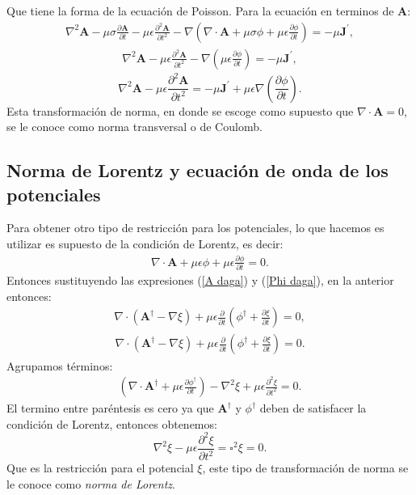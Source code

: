 \documentclass[11pt,fleqn]{book} %
\begin{document}
Que tiene la forma de la ecuaci\'on de Poisson. Para la ecuaci\'on en terminos de $\textbf{A}$:
\begin{eqnarray*}
\nabla^{2}\textbf{A}-\mu\sigma\frac{\partial \textbf{A}}{\partial t}-\mu\epsilon\frac{\partial^{2} \textbf{A}}{\partial t^{2}}-\nabla\left(\nabla\cdot\textbf{A}+\mu\sigma\phi+\mu\epsilon\frac{\partial \phi}{\partial t}\right)=-\mu\textbf{J}^{'},
\end{eqnarray*}
\begin{eqnarray*}
\nabla^{2}\textbf{A}-\mu\epsilon\frac{\partial^{2} \textbf{A}}{\partial t^{2}}-\nabla\left(\mu\epsilon\frac{\partial \phi}{\partial t}\right)=-\mu\textbf{J}^{'},
\end{eqnarray*}
\begin{equation}
\nabla^{2}\textbf{A}-\mu\epsilon\frac{\partial^{2} \textbf{A}}{\partial t^{2}}=-\mu\textbf{J}^{'}+\mu\epsilon\nabla\left(\frac{\partial \phi}{\partial t}\right).
\end{equation}
Esta transformaci\'on de norma, en donde se escoge como supuesto que $\nabla\cdot\textbf{A}=0$, se le conoce como norma transversal o de Coulomb.

\subsection{Norma de Lorentz y ecuaci\'on de onda de los potenciales}
Para obtener otro tipo de restricci\'on para los potenciales, lo que hacemos es utilizar es supuesto de la condici\'on de Lorentz, es decir:
\begin{eqnarray*}
\nabla\cdot\textbf{A}+\mu\epsilon\phi+\mu\epsilon\frac{\partial \phi}{\partial t}=0.
\end{eqnarray*}
Entonces sustituyendo las expresiones (\ref{A daga}) y (\ref{Phi daga}), en la anterior entonces:
\begin{eqnarray*}
\nabla\cdot \left( \textbf{A}^{\dagger}-\nabla\xi \right)+\mu\epsilon\frac{\partial }{\partial t}\left(\phi^{\dagger}+\frac{\partial \xi}{\partial t}\right)=0,
\end{eqnarray*}
\begin{eqnarray*}
\nabla\cdot \left( \textbf{A}^{\dagger}-\nabla\xi \right)+\mu\epsilon\frac{\partial }{\partial t}\left(\phi^{\dagger}+\frac{\partial \xi}{\partial t}\right)=0.
\end{eqnarray*}
Agrupamos t\'erminos:
\begin{eqnarray*}
\left(\nabla\cdot\textbf{A}^{\dagger}+\mu\epsilon\frac{\partial \phi^{\dagger}}{\partial t}\right)-\nabla^{2}\xi+\mu\epsilon\frac{\partial^{2} \xi}{\partial t^{2}}=0.
\end{eqnarray*}
El termino entre par\'entesis es cero ya que $\textbf{A}^{\dagger}$ y $\phi^{\dagger}$ deben de satisfacer la condici\'on de Lorentz, entonces obtenemos:
\begin{equation}
\nabla^{2}\xi-\mu\epsilon\frac{\partial^{2} \xi}{\partial t^{2}}=\square^{2}\xi=0.
\end{equation}
Que es la restricci\'on para el potencial $\xi$, este tipo de transformaci\'on de norma se le conoce como \textit{norma de Lorentz}.
\end{document}
